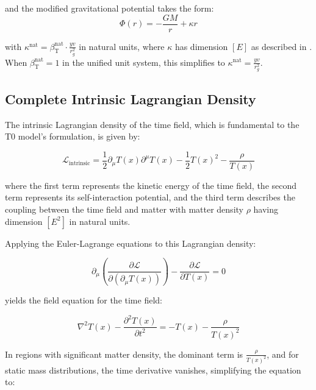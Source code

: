 \documentclass[12pt,a4paper]{article}
\newcommand{\Tfield}{T(x)}
\newcommand{\betaT}{\beta_{\text{T}}}
\begin{document}
	and the modified gravitational potential takes the form:
	\begin{equation}
		\Phi(r) = -\frac{G M}{r} + \kappa r
	\end{equation}
	
	with \(\kappa^{\text{nat}} = \betaT^{\text{nat}} \cdot \frac{yv}{r_g^2}\) in natural units, where \(\kappa\) has dimension \([E]\) as described in \cite{pascher_emergente_gravitation_2025}. When \(\betaT^{\text{nat}} = 1\) in the unified unit system, this simplifies to \(\kappa^{\text{nat}} = \frac{yv}{r_g^2}\).
	
	\subsection{Complete Intrinsic Lagrangian Density}
	\label{subsec:intrinsic_lagrangian}
	
	The intrinsic Lagrangian density of the time field, which is fundamental to the T0 model's formulation, is given by:
	
	\begin{equation}
		\mathcal{L}_{\text{intrinsic}} = \frac{1}{2} \partial_\mu \Tfield \partial^\mu \Tfield - \frac{1}{2}\Tfield^2 - \frac{\rho}{\Tfield}
	\end{equation}
	
	where the first term represents the kinetic energy of the time field, the second term represents its self-interaction potential, and the third term describes the coupling between the time field and matter with matter density $\rho$ having dimension $[E^2]$ in natural units.
	
	Applying the Euler-Lagrange equations to this Lagrangian density:
	
	\begin{equation}
		\partial_\mu \left( \frac{\partial \mathcal{L}}{\partial(\partial_\mu \Tfield)} \right) - \frac{\partial \mathcal{L}}{\partial \Tfield} = 0
	\end{equation}
	
	yields the field equation for the time field:
	
	\begin{equation}
		\nabla^2 \Tfield - \frac{\partial^2 \Tfield}{\partial t^2} = -\Tfield - \frac{\rho}{\Tfield^2}
	\end{equation}
	
	In regions with significant matter density, the dominant term is $\frac{\rho}{\Tfield^2}$, and for static mass distributions, the time derivative vanishes, simplifying the equation to:
	
\end{document}
